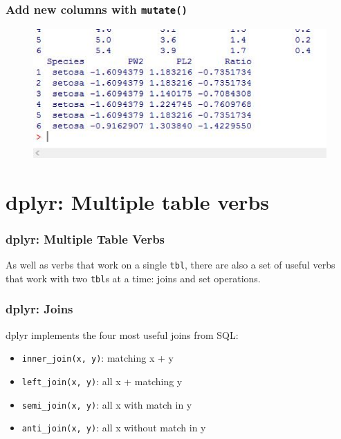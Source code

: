 \documentclass{beamer}
\begin{document}
\begin{frame}
	
	\frametitle{Add new columns with \texttt{mutate()} }
	\begin{figure}
		\centering
		\includegraphics[width=0.9\linewidth]{images/irismutate2}
		
	\end{figure}
	
\end{frame}
\section{dplyr: Multiple table verbs}

\begin{frame}
	\frametitle{dplyr: Multiple Table Verbs}
	\large
	As well as verbs that work on a single \texttt{tbl}, there are also a set of useful verbs that work with two \texttt{tbl}s at a time: joins and set operations.
\end{frame}

\begin{frame}
	\frametitle{dplyr: Joins}
	\large
	dplyr implements the four most useful joins from SQL:
	
	\begin{itemize}
		\item \texttt{inner\_join(x, y)}: matching x + y
		\item \texttt{left\_join(x, y)}: all x + matching y
		\item \texttt{semi\_join(x, y)}: all x with match in y
		\item \texttt{anti\_join(x, y)}: all x without match in y
	\end{itemize}
\end{frame}
\end{document}
